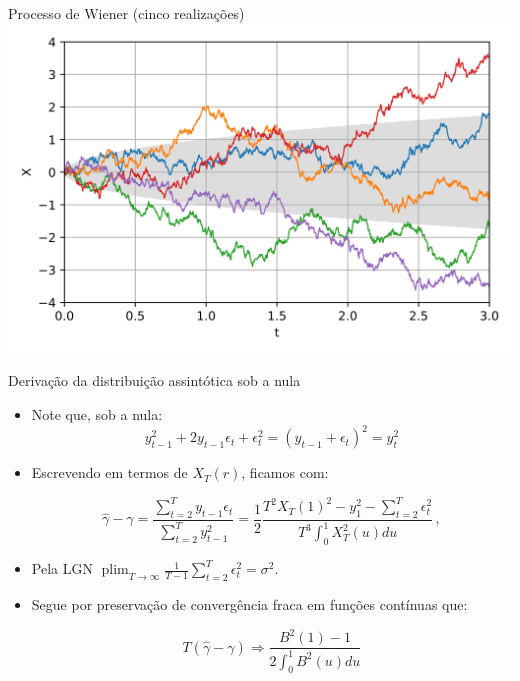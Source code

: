 \documentclass[11pt]{beamer}
\begin{document}
\begin{frame}{Processo de Wiener (cinco realizações)}
	\centering
	\includegraphics[scale=0.15]{graficos/wiener.png}
\end{frame}
\begin{frame}{Derivação da distribuição assintótica sob a nula}
	\begin{itemize}
		\item Note que, sob a nula:
		$$y_{t-1}^2 + 2y_{t-1}\epsilon_t+\epsilon_t^2 = (y_{t-1}+\epsilon_t)^2 = y_t^2$$
		\item Escrevendo em termos de $X_T(r)$, ficamos com:
		
		$$\hat{\gamma} -  \gamma = \frac{\sum_{t=2}^T y_{t-1}\epsilon_t}{\sum_{t=2}^Ty_{t-1}^2} =  \frac{1}{2} \frac{ T^2  X_T(1)^2 - y_{1}^2 - \sum_{t=2}^T \epsilon_t^2}{T^3 \int_0^1 X_T^2(u) du}\,,$$
		\item Pela LGN $\operatorname{plim}_{T \to \infty}\frac{1}{T-1}\sum_{t=2}^T \epsilon^2_t =\sigma^2$.
		\item Segue por preservação de convergência fraca em funções contínuas que:
		
		$$T(\hat{\gamma} -  \gamma) \Rightarrow \frac{B^2(1) -1}{2\int_0^1 B^2(u) du}$$
	\end{itemize}
	\hfill \hyperlink{main_text}{} 
\end{frame}
\end{document}
